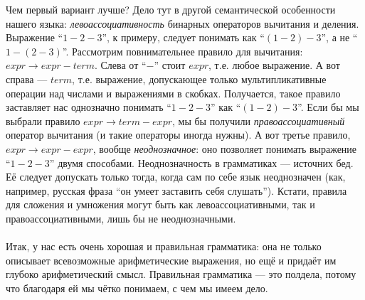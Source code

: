 \documentclass[11pt]{book}
\begin{document}
Чем первый вариант лучше? Дело тут в другой семантической особенности
нашего языка: \emph{левоассоциативность} бинарных операторов вычитания и деления.
Выражение ``$1 - 2 - 3$'', к примеру, следует понимать как ``$(1 - 2) - 3$'', а не ``$1 - (2 - 3)$''.
Рассмотрим повнимательнее правило для вычитания: $expr \rightarrow expr - term$.
Слева от ``$-$'' стоит $expr$, т.е. любое выражение. А вот справа --- $term$,
т.е. выражение, допускающее только мультипликативные операции над числами и выражениями в скобках.
Получается, такое правило заставляет нас однозначно понимать ``$1 - 2 - 3$'' как ``$(1 - 2) - 3$''.
Если бы мы выбрали правило $expr \rightarrow term - expr$, мы бы получили \emph{правоассоциативный}
оператор вычитания (и такие операторы иногда нужны). А вот третье правило, $expr \rightarrow expr - expr$,
вообще \emph{неоднозначное}: оно позволяет понимать выражение ``$1 - 2 - 3$''
двумя способами. Неоднозначность в грамматиках --- источних бед. Её следует допускать только тогда, когда
сам по себе язык неоднозначен (как, например, русская фраза ``он умеет заставить себя слушать'').
Кстати, правила для сложения и умножения могут быть как левоассоциативными, так и правоассоциативными, лишь бы не неоднозначными.
\\ \\
Итак, у нас есть очень хорошая и правильная грамматика: она не только
описывает всевозможные арифметические выражения, но ещё и придаёт им глубоко арифметический
смысл. Правильная грамматика --- это полдела, потому что благодаря ей мы
чётко понимаем, с чем мы имеем дело.
\end{document}
